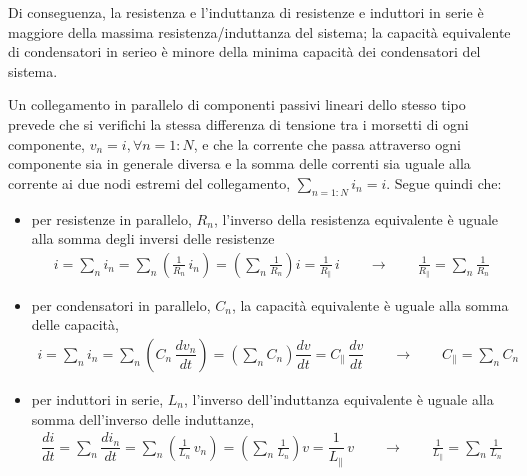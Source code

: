 \documentclass[letterpaper,10pt,italian]{jupyterBook}
\begin{document}
\sphinxAtStartPar
Di conseguenza, la resistenza e l’induttanza di resistenze e induttori in serie è maggiore della massima resistenza/induttanza del sistema; la capacità equivalente di condensatori in serieo è minore della minima capacità dei condensatori del sistema.

\sphinxAtStartPar
{} Un collegamento in parallelo di componenti passivi lineari dello stesso tipo prevede che si verifichi la stessa differenza di tensione tra i morsetti di ogni componente, \(v_n = i, \forall n=1:N\), e che la corrente che passa attraverso ogni componente sia in generale diversa e la somma delle correnti sia uguale alla corrente ai due nodi estremi del collegamento, \(\sum_{n=1:N} i_n = i\). Segue quindi che:
\begin{itemize}
\item {} 
\sphinxAtStartPar
per resistenze in parallelo, \(R_n\), l’inverso della resistenza equivalente è uguale alla somma degli inversi delle resistenze
\begin{equation*}
\begin{split}i = \sum_n i_n = \sum_n \left( \frac{1}{R_n} \, i_n \right) = \left( \sum_n \frac{1}{R_n} \right) i = \frac{1}{R_{\parallel}} \, i \qquad \rightarrow \qquad \frac{1}{R_{\parallel}} = \sum_n \frac{1}{R_n}\end{split}
\end{equation*}
\item {} 
\sphinxAtStartPar
per condensatori in parallelo, \(C_n\), la capacità equivalente è uguale alla somma delle capacità,
\begin{equation*}
\begin{split}i = \sum_n i_n = \sum_n \left( C_n \, \dfrac{d v_n}{d t} \right) = \left( \sum_n C_n \right) \dfrac{d v}{dt} = C_{\parallel} \, \dfrac{d v}{dt} \qquad \rightarrow \qquad C_{\parallel} = \sum_n C_n\end{split}
\end{equation*}
\item {} 
\sphinxAtStartPar
per induttori in serie, \(L_n\), l’inverso dell’induttanza equivalente è uguale alla somma dell’inverso delle induttanze,
\begin{equation*}
\begin{split}\dfrac{d i}{dt} = \sum_n \dfrac{d i_n}{dt} = \sum_n \left( \frac{1}{L_n} \, v_n \right) = \left( \sum_n \frac{1}{L_n} \right) v = \dfrac{1}{L_{\parallel}} \, v \qquad \rightarrow \qquad \frac{1}{L_{\parallel}} = \sum_n \frac{1}{L_n}\end{split}
\end{equation*}
\end{itemize}
\end{document}
